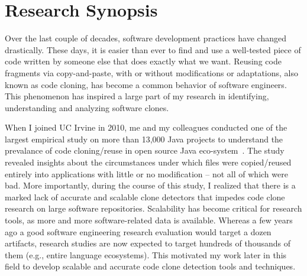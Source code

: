 \documentclass[a4paper]{article}
\begin{document}

\section*{Research Synopsis}


Over the last couple of decades, software development
practices have changed drastically. 
These days, it is easier than ever to find and 
use a well-tested piece of code written by someone else that
does exactly what we want. Reusing code
fragments via copy-and-paste, with or without modifications
or adaptations, also known as code cloning, has become a common behavior of software engineers. This phenomenon has inspired a large part of my research in identifying, understanding and analyzing software clones. 


When I joined UC Irvine in 2010, me and my colleagues conducted one of the largest empirical study
on more than 13,000 Java projects to understand the prevalance of code cloning/reuse in open source Java eco-system~\cite{filecloning}.
The study revealed insights about the circumstances under which files were copied/reused entirely into applications with little or no modification -- not all of which were bad. 
More importantly, during the course of this study, I realized that there is a marked lack of accurate and scalable clone detectors that impedes code clone research on large software repositories. 
Scalability has become critical for research tools, as more and more software-related data is available. Whereas a few years ago a good software engineering research evaluation would target a dozen artifacts, research studies are now expected to target hundreds of thousands of them (e.g., entire language ecosystems). This motivated my work later in this field to develop scalable and accurate code clone detection tools and techniques.  
\end{document}
